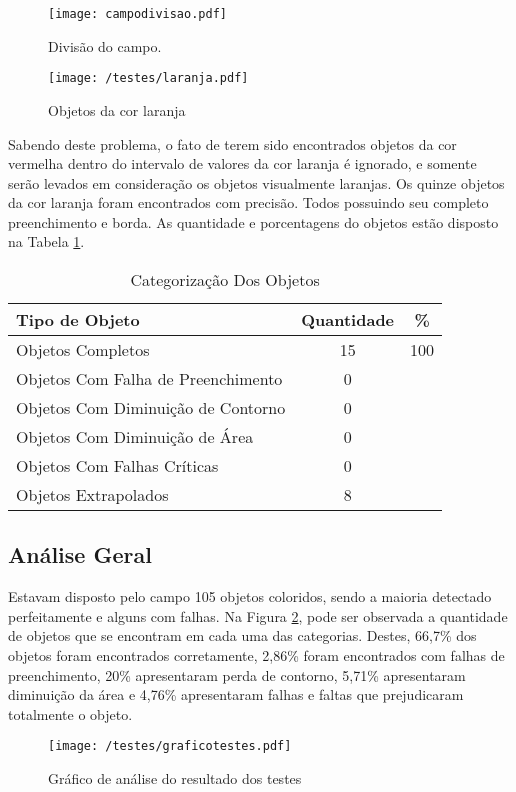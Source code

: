 		\begin{figure}[H]
			\begin{minipage}[b]{0.45\linewidth}
				\centering
				\texttt{[image: campodivisao.pdf]}
				\caption{Divisão do campo.}				
			\end{minipage}
			\hspace{0.5cm}
			\begin{minipage}[b]{0.45\linewidth}
				\centering
				\texttt{[image: /testes/laranja.pdf]}
				\caption{Objetos da cor laranja}
				\label{fig:laranja}
			\end{minipage}
		\end{figure}
	Sabendo deste problema, o fato de terem sido encontrados objetos da cor vermelha dentro do intervalo de valores da cor laranja é ignorado, e somente serão levados em consideração os objetos visualmente laranjas.
	Os quinze objetos da cor laranja foram encontrados com precisão. Todos possuindo seu completo preenchimento e borda. As quantidade e porcentagens do objetos estão disposto na Tabela \ref{tab:laranja}.
	
\begin{table}[H]
\centering
\begin{tabular}{l|c|c}
Tipo de Objeto & Quantidade  & \% \\ %
\hline                               %
Objetos Completos &  15 & 100 \\
\hline 
Objetos Com Falha de Preenchimento & 0 \\
\hline 
Objetos Com Diminuição de Contorno &  0 \\
\hline 
Objetos Com Diminuição de Área &  0 \\
\hline 
Objetos Com Falhas Críticas & 0 \\
\hline \hline 
Objetos Extrapolados & 8 \\
\hline 
\end{tabular}
\caption{Categorização Dos Objetos}
\label{tab:laranja}
\end{table}
\newpage
\subsection{Análise Geral}
Estavam disposto pelo campo 105 objetos coloridos, sendo a maioria detectado perfeitamente e alguns com falhas. Na Figura \ref{fig:total}, pode ser observada a quantidade de objetos que se encontram em cada uma das categorias. Destes, 66,7\% dos objetos foram encontrados corretamente, 2,86\% foram encontrados com falhas de preenchimento, 20\% apresentaram perda de contorno, 5,71\% apresentaram diminuição da área e 4,76\% apresentaram falhas e faltas que prejudicaram totalmente o objeto.
	\begin{figure}[H]
		\centering
		\texttt{[image: /testes/graficotestes.pdf]}
		\caption{Gráfico de análise do resultado dos testes}
		\label{fig:total}
	\end{figure}
	
